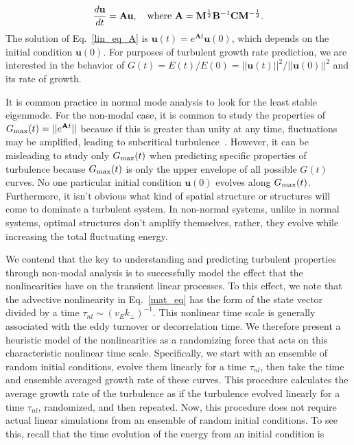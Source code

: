 \documentclass[letter,scriptaddress,twocolumn, prl,showkeys]{revtex4}
\def\beq{\begin{equation}}
\def\eeq{\end{equation}}
\newcommand{\diff}[2]{\frac{d#1}{d#2}}
\begin{document}
\beq
\label{lin_eq_A}
\diff{\mathbf{u}}{t} = \mathbf{A} \mathbf{u},  \quad \rm{where} \ \mathbf{A} = \mathbf{M}^{\frac{1}{2}} \mathbf{B}^{-1} \mathbf{C} \mathbf{M}^{-\frac{1}{2}}.
\eeq
The solution of Eq.~\ref{lin_eq_A} is $\mathbf{u}(t) = e^{\mathbf{A} t} \mathbf{u}(0)$, which
depends on the initial condition $\mathbf{u}(0)$. For purposes of turbulent growth rate prediction, we are interested in
the behavior of $G(t) = E(t)/E(0) = ||\mathbf{u}(t)||^2/||\mathbf{u}(0)||^2$ and its rate of growth.


It is common practice in normal mode analysis to look for the least stable eigenmode. 
For the non-modal case, it is common to study the properties of $G_{\rm{max}}(t) = ||e^{\mathbf{A} t}||$ because if this is greater than unity at any time, fluctuations may be amplified, 
leading to subcritical turbulence~\cite{trefethen2005,schmid2007}.
However, it can be misleading to study only $G_{\rm{max}}(t)$ when predicting specific properties of turbulence because
$G_{\rm{max}}(t)$ is only the upper envelope of all possible $G(t)$ curves. No one particular initial condition $\mathbf{u}(0)$ evolves along $G_{\rm{max}}(t)$. 
Furthermore, it isn't obvious what kind of spatial structure or structures will come to dominate a turbulent system.
In non-normal systems, unlike in normal systems, optimal structures don't amplify themselves, rather, they evolve while increasing the total fluctuating energy.

We contend that the key to understanding and predicting turbulent properties through non-modal analysis is 
to successfully model the effect that the nonlinearities have on the transient linear processes. 
To this effect, we note that the advective nonlinearity in Eq.~\ref{mat_eq} has the form of the state vector divided by a time $\tau_{nl} \sim (v_E k_\perp)^{-1}$. This nonlinear
time scale is generally associated with the eddy turnover or decorrelation time. We therefore present a heuristic model of the nonlinearities 
as a randomizing force that acts on this characteristic nonlinear time scale.
Specifically, we start with an ensemble of random initial conditions, evolve them linearly for a time $\tau_{nl}$, then take the time and ensemble averaged growth rate of these curves.
This procedure calculates the average growth rate of the turbulence as if the turbulence evolved linearly for a time $\tau_{nl}$, randomized, and then repeated. 
Now, this procedure does not require actual linear simulations from an ensemble of random initial conditions. To see this, recall that the time evolution of the energy from an initial condition is
\end{document}
